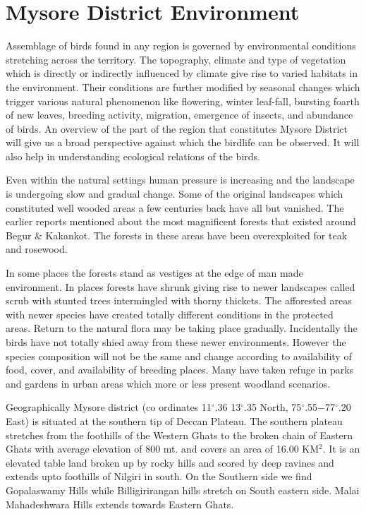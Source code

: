 \chapter{Mysore District Environment}%

Assemblage of birds found in any region is governed by 
environmental conditions stretching across the territory. The 
topography, climate and type of vegetation which is directly or 
indirectly influenced by climate give rise to varied habitats in 
the environment. Their conditions are further modified by seasonal 
changes which trigger various natural phenomenon like flowering, 
winter leaf-fall, bursting foarth of new leaves, breeding 
activity, migration, emergence of insects, and abundance of 
birds. An overview of the part of the region that constitutes 
Mysore District will give us a broad perspective against which 
the birdlife can be observed. It will also help in understanding 
ecological relations of the birds. 

\vskip 0.2cm

Even within the natural settings human pressure is increasing 
and the landscape is undergoing slow and gradual change. Some 
of the original landscapes which constituted well wooded areas a 
few centuries back have all but vanished. The earlier reports 
mentioned about the most magnificent forests that existed around 
Begur \& Kakankot. The forests in these areas have been overexploited 
for teak and rosewood. 

\vskip 0.2cm

In some places the forests stand as vestiges at the edge of 
man made environment. In places forests have shrunk giving rise 
to newer landscapes called scrub with stunted trees intermingled 
with thorny thickets. The afforested areas with newer species 
have created totally different conditions in the protected areas. 
Return to the natural flora may be taking place gradually. Incidentally 
the birds have not totally shied away from these newer 
environments. However the species composition will not be the 
same and change according to availability of food, cover, and 
availability of breeding places. Many have taken refuge in parks 
and gardens in urban areas which more or less present woodland 
scenarios. 

\vskip 0.2cm

Geographically Mysore district (co ordinates 11$^\circ$.36 13$^\circ$.35 
North, 75$^\circ$.55$-$77$^\circ$.20 East) is situated at the southern tip of 
Deccan Plateau. The southern plateau stretches from the foothills 
of the Western Ghats to the broken chain of Eastern Ghats with 
average elevation of 800 mt. and covers an area of 16.00 KM$^2$. It 
is an elevated table land broken up by rocky hills and scored by 
deep ravines and extends upto foothills of Nilgiri in south. On 
the Southern side we find Gopalaswamy Hills while Billigirirangan 
hills stretch on South eastern side. Malai Mahadeshwara Hills 
extends towards Eastern Ghats. 

